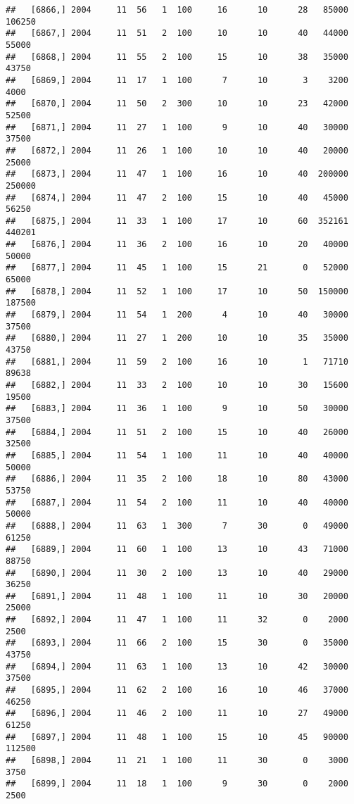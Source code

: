\documentclass{article}\usepackage[]{graphicx}\usepackage[]{color}
\makeatletter
\newenvironment{kframe}{%
 \def\at@end@of@kframe{}%
 \ifinner\ifhmode%
  \def\at@end@of@kframe{\end{minipage}}%
  \begin{minipage}{\columnwidth}%
 \fi\fi%
 \def\FrameCommand##1{\hskip\@totalleftmargin \hskip-\fboxsep
 \colorbox{shadecolor}{##1}\hskip-\fboxsep
     \hskip-\linewidth \hskip-\@totalleftmargin \hskip\columnwidth}%
 \MakeFramed {\advance\hsize-\width
   \@totalleftmargin\z@ \linewidth\hsize
   \@setminipage}}%
 {\par\unskip\endMakeFramed%
 \at@end@of@kframe}
\newenvironment{knitrout}{}{} %
\makeatother
\begin{document}
\begin{knitrout}
\begin{kframe}
\begin{verbatim}
##   [6866,] 2004     11  56   1  100     16      10      28   85000  106250
##   [6867,] 2004     11  51   2  100     10      10      40   44000   55000
##   [6868,] 2004     11  55   2  100     15      10      38   35000   43750
##   [6869,] 2004     11  17   1  100      7      10       3    3200    4000
##   [6870,] 2004     11  50   2  300     10      10      23   42000   52500
##   [6871,] 2004     11  27   1  100      9      10      40   30000   37500
##   [6872,] 2004     11  26   1  100     10      10      40   20000   25000
##   [6873,] 2004     11  47   1  100     16      10      40  200000  250000
##   [6874,] 2004     11  47   2  100     15      10      40   45000   56250
##   [6875,] 2004     11  33   1  100     17      10      60  352161  440201
##   [6876,] 2004     11  36   2  100     16      10      20   40000   50000
##   [6877,] 2004     11  45   1  100     15      21       0   52000   65000
##   [6878,] 2004     11  52   1  100     17      10      50  150000  187500
##   [6879,] 2004     11  54   1  200      4      10      40   30000   37500
##   [6880,] 2004     11  27   1  200     10      10      35   35000   43750
##   [6881,] 2004     11  59   2  100     16      10       1   71710   89638
##   [6882,] 2004     11  33   2  100     10      10      30   15600   19500
##   [6883,] 2004     11  36   1  100      9      10      50   30000   37500
##   [6884,] 2004     11  51   2  100     15      10      40   26000   32500
##   [6885,] 2004     11  54   1  100     11      10      40   40000   50000
##   [6886,] 2004     11  35   2  100     18      10      80   43000   53750
##   [6887,] 2004     11  54   2  100     11      10      40   40000   50000
##   [6888,] 2004     11  63   1  300      7      30       0   49000   61250
##   [6889,] 2004     11  60   1  100     13      10      43   71000   88750
##   [6890,] 2004     11  30   2  100     13      10      40   29000   36250
##   [6891,] 2004     11  48   1  100     11      10      30   20000   25000
##   [6892,] 2004     11  47   1  100     11      32       0    2000    2500
##   [6893,] 2004     11  66   2  100     15      30       0   35000   43750
##   [6894,] 2004     11  63   1  100     13      10      42   30000   37500
##   [6895,] 2004     11  62   2  100     16      10      46   37000   46250
##   [6896,] 2004     11  46   2  100     11      10      27   49000   61250
##   [6897,] 2004     11  48   1  100     15      10      45   90000  112500
##   [6898,] 2004     11  21   1  100     11      30       0    3000    3750
##   [6899,] 2004     11  18   1  100      9      30       0    2000    2500

\end{verbatim}
\end{kframe}
\end{knitrout}
\end{document}
